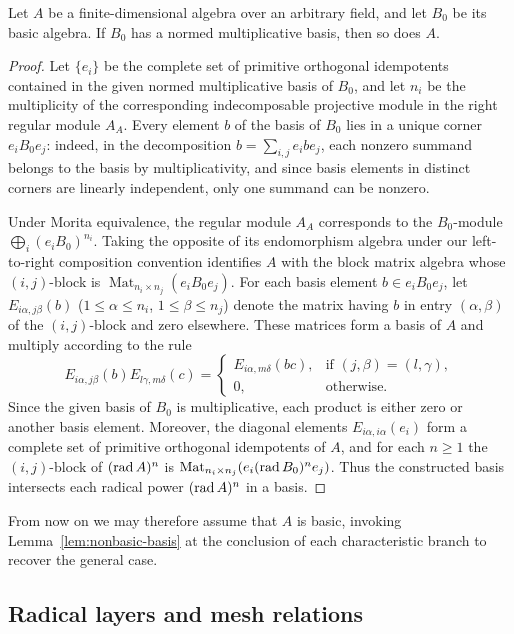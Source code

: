 \begin{lemma}
\label{lem:nonbasic-basis}
Let $A$ be a finite-dimensional algebra over an arbitrary field, and let
$B_0$ be its basic algebra. If $B_0$ has a normed multiplicative basis, then
so does $A$.
\end{lemma}
\begin{proof}
Let $\{e_i\}$ be the complete set of primitive orthogonal idempotents
contained in the given normed multiplicative basis of $B_0$, and let $n_i$
be the multiplicity of the corresponding indecomposable projective module in
the right regular module $A_A$. Every element $b$ of the basis of $B_0$ lies
in a unique corner $e_i B_0 e_j$: indeed, in the decomposition
$b=\sum_{i,j} e_i b e_j$, each nonzero summand belongs to the basis by
multiplicativity, and since basis elements in distinct corners are linearly
independent, only one summand can be nonzero.

Under Morita equivalence, the regular module $A_A$ corresponds to the
$B_0$-module $\bigoplus_i (e_i B_0)^{n_i}$. Taking the opposite of its
endomorphism algebra under our left-to-right composition convention
identifies $A$ with the block matrix algebra whose $(i,j)$-block is
$\operatorname{Mat}_{n_i\times n_j}(e_i B_0 e_j)$. For each basis element
$b\in e_i B_0 e_j$, let $E_{i\alpha,j\beta}(b)$ ($1\leq\alpha\leq n_i$,
$1\leq\beta\leq n_j$) denote the matrix having $b$ in entry $(\alpha,\beta)$
of the $(i,j)$-block and zero elsewhere. These matrices form a basis of $A$
and multiply according to the rule
\[
 E_{i\alpha,j\beta}(b)E_{l\gamma,m\delta}(c)
 =\begin{cases}
 E_{i\alpha,m\delta}(bc),&\text{if }(j,\beta)=(l,\gamma),\\
 0,&\text{otherwise}.
 \end{cases}
\]
Since the given basis of $B_0$ is multiplicative, each product is either
zero or another basis element. Moreover, the diagonal elements
$E_{i\alpha,i\alpha}(e_i)$ form a complete set of primitive orthogonal
idempotents of $A$, and for each $n\geq1$ the $(i,j)$-block of $(\operatorname{rad} A)^n$
is $\operatorname{Mat}_{n_i\times n_j}(e_i(\operatorname{rad} B_0)^n e_j)$. Thus the
constructed basis intersects each radical power $(\operatorname{rad} A)^n$ in a basis.
\end{proof}

From now on we may therefore assume that $A$ is basic, invoking
Lemma~\ref{lem:nonbasic-basis} at the conclusion of each characteristic
branch to recover the general case.

\subsection{Radical layers and mesh relations}

